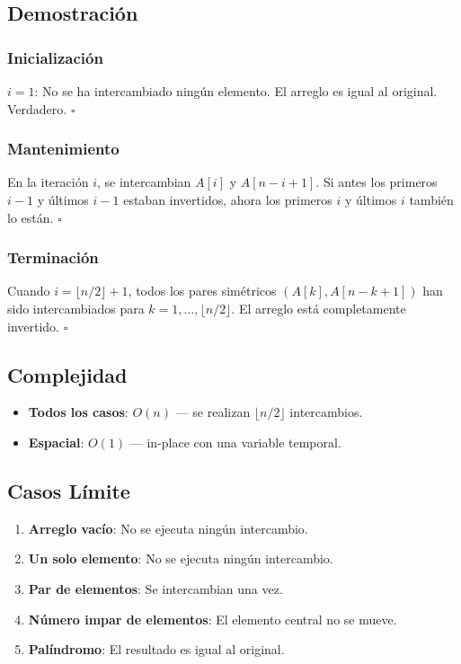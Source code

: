 \documentclass[11pt,a4paper]{article}
\begin{document}
\subsection{Demostración}

\subsubsection{Inicialización}
$i = 1$: No se ha intercambiado ningún elemento. El arreglo es igual al original. Verdadero. $\square$

\subsubsection{Mantenimiento}
En la iteración $i$, se intercambian $A[i]$ y $A[n-i+1]$. Si antes los primeros $i-1$ y últimos $i-1$ estaban invertidos, ahora los primeros $i$ y últimos $i$ también lo están. $\square$

\subsubsection{Terminación}
Cuando $i = \lfloor n/2 \rfloor + 1$, todos los pares simétricos $(A[k], A[n-k+1])$ han sido intercambiados para $k = 1, \ldots, \lfloor n/2 \rfloor$. El arreglo está completamente invertido. $\square$

\subsection{Complejidad}
\begin{itemize}
    \item \textbf{Todos los casos}: $O(n)$ --- se realizan $\lfloor n/2 \rfloor$ intercambios.
    \item \textbf{Espacial}: $O(1)$ --- in-place con una variable temporal.
\end{itemize}

\subsection{Casos Límite}
\begin{enumerate}
    \item \textbf{Arreglo vacío}: No se ejecuta ningún intercambio.
    \item \textbf{Un solo elemento}: No se ejecuta ningún intercambio.
    \item \textbf{Par de elementos}: Se intercambian una vez.
    \item \textbf{Número impar de elementos}: El elemento central no se mueve.
    \item \textbf{Palíndromo}: El resultado es igual al original.
\end{enumerate}
\end{document}
